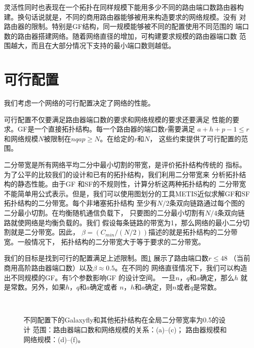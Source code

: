 灵活性同时也表现在一个拓扑在同样规模下能用多少不同的路由端口数路由器构建。换句话说就是，不同的商用路由器能够被用来构造要求的网络规模。没有
对路由器的限制。特别是GF结构，同一规模能够被不同的配置使用不同范围的
端口数的路由器搭建网络。随着网络直径的增加，可构建要求规模的路由器端口数
范围越大，而且在大部分情况下支持的最小端口数则越低。

\section{可行配置}

我们考虑一个网络的可行配置决定了网络的性能。

可行配置不仅要满足路由器端口数的要求和网络规模的要求还要满足
性能的要求。GF是一个直接拓扑结构。每一个路由器的端口数$r$需要满足
$a+h+p-1\leq r$和网络规模$N$被限制在$nqap\geq N$。在给定的$r$和$N$，
这些约束提供了可行配置的范围。

二分带宽是所有网络平均二分中最小切割的带宽，是评价拓扑结构传统的
指标。为了公平的比较我们的设计和已有的拓扑结构，我们利用二分带宽来
分析拓扑结构的静态性能。由于GF 和SF的不规则性，计算分析这两种拓扑结构的
二分带宽不能简单用公式表示。但是，我们可以使用图划分的工具METIS近似求解GF和SF拓扑结构的二分带宽。每个非堵塞拓扑结构
至少有$N/2$条双向链路通过每个图的二分最小切割。在均衡随机通信负载下，
只要图的二分最小切割有$N/4$条双向链路就使网络是均衡负载的。我们
假设每条链路的带宽为1，那么网络的最小二分切割就是二分带宽。因此，
$\beta=(C_{min}/(N/2))$描述的就是拓扑结构的二分带宽。一般情况下，
拓扑结构的二分带宽大于等于要求的二分带宽。

我们的目标是找到可行的配置满足上述限制。图\ref{fig:Figure6} 展示了路由端口数$r\leq 48$ （当前商用高阶路由器端口数）以及$\beta \approx 0.5$。在不同的
网络直径情况下，我们可以构造出不同规模的GF。有5个参数影响GF 的设计空间。
一旦$n$，$q$和$a$确定，那么$h$ 就是常数。另外，如果$h$，$q$和$a$确定或者
$n$，$h$和$a$确定，则$n$或者$q$是常数。


 \begin{figure}[t]
  \centering
  \begin{minipage}[t]{\textwidth}
   \centering
  \\
  \caption{不同配置下的Galaxyfly和其他拓扑结构在全局二分带宽率为0.5的设计 范围：路由器端口数和网络规模的关系：(a)--(c)； 路由器规模和网络规模：(d)--(f)。 }
  \label{fig:Figure6}
  \end{minipage}
\end{figure}


